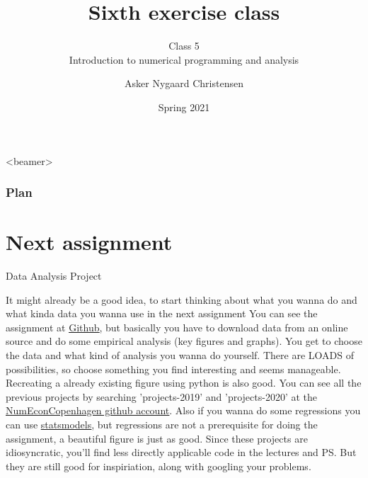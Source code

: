 \documentclass[10pt,danish,t,10pt]{beamer}
\title{Sixth exercise class \vspace{-2mm}}
\subtitle{Class 5 \\Introduction to numerical programming and analysis \vspace{-4mm} }
\author{Asker Nygaard Christensen}
\date{Spring 2021}
\makeatletter
\let\origtableofcontents=\tableofcontents
\def\tableofcontents{\@ifnextchar[{\origtableofcontents}{\gobbletableofcontents}}
\def\gobbletableofcontents#1{\origtableofcontents}
\makeatother
\begin{document}
{
\begin{frame}

\maketitle


\end{frame}
}

\addtocounter{framenumber}{-1}

\begin{frame}<beamer>
\frametitle{Plan}

\tableofcontents[]
\end{frame}



\section{Next assignment}
\begin{frame}{Data Analysis Project}

    It might already be a good idea, to start thinking about what you wanna do and what kinda data you wanna use in the next assignment \newline
    You can see the assignment at \href{https://github.com/NumEconCopenhagen/lectures-2021/blob/master/projects/DataProject.pdf}{\underline{Github}}, but basically you have to download data from an online source and do some empirical analysis (key figures and graphs).
    You get to choose the data and what kind of analysis you wanna do yourself. There are LOADS of possibilities, so choose something you find interesting and seems manageable. Recreating a already existing figure using python is also good. \newline
    You can see all the previous projects by searching 'projects-2019' and 'projects-2020' at the \href{https://github.com/NumEconCopenhagen}{\underline{NumEconCopenhagen github account}}. \newline
    Also if you wanna do some regressions you can use \href{https://www.statsmodels.org/stable/user-guide.html}{\underline{statsmodels}}, but regressions are not a prerequisite for doing the assignment, a beautiful figure is just as good. \newline
    Since these projects are idiosyncratic, you'll find less directly applicable code in the lectures and PS. But they are still good for inspiriation, along with googling your problems.
\end{frame}
\end{document}
